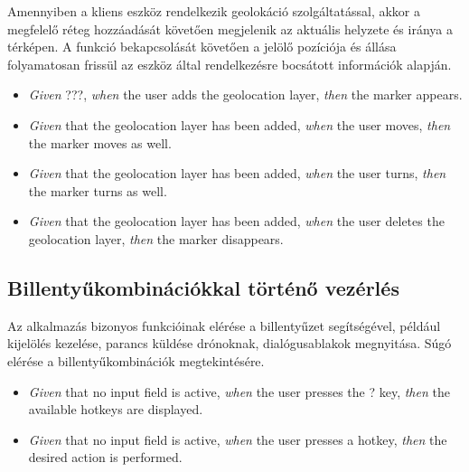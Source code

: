 Amennyiben a kliens eszköz rendelkezik geolokáció szolgáltatással, akkor a megfelelő réteg hozzáadását követően megjelenik az aktuális helyzete és iránya a térképen.
A funkció bekapcsolását követően a jelölő pozíciója és állása folyamatosan frissül az eszköz által rendelkezésre bocsátott információk alapján.

\begin {itemize}
  \item \textit{Given} ???, \textit{when} the user adds the geolocation layer, \textit{then} the marker appears.
  \item \textit{Given} that the geolocation layer has been added, \textit{when} the user moves, \textit{then} the marker moves as well.
  \item \textit{Given} that the geolocation layer has been added, \textit{when} the user turns, \textit{then} the marker turns as well.
  \item \textit{Given} that the geolocation layer has been added, \textit{when} the user deletes the geolocation layer, \textit{then} the marker disappears.
\end {itemize}


\subsection{Billentyűkombinációkkal történő vezérlés}

Az alkalmazás bizonyos funkcióinak elérése a billentyűzet segítségével, például kijelölés kezelése, parancs küldése drónoknak, dialógusablakok megnyitása.
Súgó elérése a billentyűkombinációk megtekintésére.

\begin {itemize}
  \item \textit{Given} that no input field is active, \textit{when} the user presses the ? key, \textit{then} the available hotkeys are displayed.
  \item \textit{Given} that no input field is active, \textit{when} the user presses a hotkey, \textit{then} the desired action is performed.
\end {itemize}
